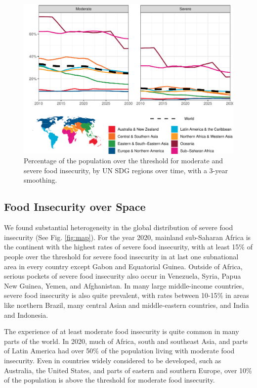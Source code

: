 \documentclass{article}
\begin{document}
\begin{figure}[H]
  \centering
  \includegraphics[width=\linewidth]{img/Rates.pdf}
  \caption{Percentage of the population over the threshold for moderate and severe food insecurity, by UN SDG regions over time, with a 3-year smoothing.}
  \label{fig:rates}
\end{figure}


\subsection{Food Insecurity over Space}
We found substantial heterogeneity in the global distribution of severe food insecurity (See Fig. \ref{fig:map}).  For the year 2020, mainland sub-Saharan Africa is the continent with the highest rates of severe food insecurity, with at least 15\% of people over the threshold for severe food insecurity in at last one subnational area in every country except Gabon and Equatorial Guinea.  Outside of Africa, serious pockets of severe food insecurity also occur in Venezuela, Syria, Papua New Guinea, Yemen, and Afghanistan.  In many large middle-income countries, severe food insecurity is also quite prevalent, with rates between 10-15\% in areas like northern Brazil, many central Asian and middle-eastern countries, and India and Indonesia.

The experience of at least moderate food insecurity is quite common in many parts of the world.  In 2020, much of Africa, south and southeast Asia, and parts of Latin America had over 50\% of the population living with moderate food insecurity.  Even in countries widely considered to be developed, such as Australia, the United States, and parts of eastern and southern Europe, over 10\% of the population is above the threshold for moderate food insecurity.  
\end{document}
